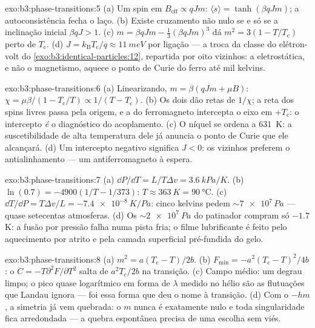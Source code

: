 \begin{solution}{exo:b3:phase-transitions:5}
(a) Um spin em $B_{\text{eff}} \propto qJm$: $\langle s\rangle =
\tanh(\beta qJm)$; a autoconsistência fecha o laço. (b) Existe
cruzamento não nulo se e só se a inclinação inicial $\beta qJ > 1$. (c) $m =
\beta qJm - \tfrac13(\beta qJm)^3$ dá $m^2 = 3(1 -
T/T_{\text{c}})$ perto de $T_{\text{c}}$. (d) $J =
k_{\text{B}}T_{\text{c}}/q \approx \qty{11}{meV}$ por ligação ---
a troca da classe do elétron-volt do
\cref{exo:b3:identical-particles:12}, repartida por oito
vizinhos: a eletrostática, e não o magnetismo, aquece o ponto de Curie
do ferro até mil kelvins.
\end{solution}

\begin{solution}{exo:b3:phase-transitions:6}
(a) Linearizando, $m = \beta(qJm + \mu B)$: $\chi =
\mu\beta/(1 - T_{\text{c}}/T) \propto 1/(T - T_{\text{c}})$. (b)
Os dois dão retas de $1/\chi$; a reta dos spins livres passa
pela origem, e a do ferromagneto intercepta o eixo em
$+T_{\text{c}}$: o intercepto \emph{é} o diagnóstico do
acoplamento. (c) O níquel se ordena a \qty{631}{K}: a suscetibilidade
de alta temperatura dele já anuncia o ponto de Curie que ele alcançará.
(d) Um intercepto negativo significa $J < 0$: os vizinhos preferem o
antialinhamento --- um antiferromagneto à espera.
\end{solution}

\begin{solution}{exo:b3:phase-transitions:7}
(a) $\dd P/\dd T = L/T\Delta v = \qty{3.6}{kPa/K}$. (b)
$\ln(0.7) = -4900(1/T - 1/373)$: $T \approx \qty{363}{K} =
\qty{90}{\celsius}$. (c) $\dd T/\dd P = T\Delta v/L =
\qty{-7.4e-8}{K/Pa}$: cinco kelvins pedem $\sim\num{7e7}\,\unit{Pa}$
--- quase setecentas atmosferas. (d) Os
$\sim\qty{2e7}{Pa}$ do patinador compram só $-1.7$ K: a fusão por
pressão falha numa pista fria; o filme lubrificante é feito pelo
aquecimento por atrito e pela camada superficial pré-fundida do gelo.
\end{solution}

\begin{solution}{exo:b3:phase-transitions:8}
(a) $m^2 = a(T_{\text{c}} - T)/2b$. (b) $F_{\min} =
-a^2(T_{\text{c}} - T)^2/4b$: o $C = -T\partial^2F/\partial T^2$
salta de $a^2T_{\text{c}}/2b$ na transição. (c) Campo médio:
um degrau limpo; o pico quase logarítmico em forma de $\lambda$ medido
no hélio são as flutuações que Landau ignora --- foi essa forma que
deu o nome à transição. (d) Com o $-hm$, a simetria já vem
quebrada: o $m$ nunca é exatamente nulo e toda singularidade fica
arredondada --- a quebra espontânea precisa de uma escolha sem viés.
\end{solution}

